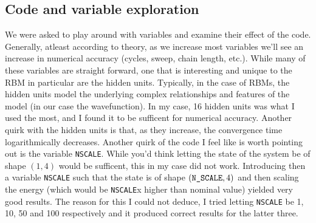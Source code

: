 \documentclass{article}
\begin{document}
\subsection{Code and variable exploration}
We were asked to play around with variables and examine their effect of the code. Generally, atleast according to theory, as we increase most variables we'll see an increase in numerical accuracy (cycles, sweep, chain length, etc.). While many of these variables are straight forward, one that is interesting and unique to the RBM in particular are the hidden units. Typically, in the case of RBMs, the hidden units model the underlying complex relationships and features of the model (in our case the wavefunction). In my case, 16 hidden units was what I used the most, and I found it to be sufficent for numerical accuracy. Another quirk with the hidden units is that, as they increase, the convergence time logarithmically decreases. \newline
Another quirk of the code I feel like is worth pointing out is the variable \texttt{N\textunderscore SCALE}. While you'd think letting the state of the system be of shape $(1,4)$ would be sufficent, this in my case did not work. Introducing then a variable \texttt{N\textunderscore SCALE} such that the state is of shape $(\texttt{N\textunderscore SCALE}, 4)$ and then scaling the energy (which would be \texttt{N\textunderscore SCALE}x higher than nominal value) yielded very good results. The reason for this I could not deduce, I tried letting \texttt{N\textunderscore SCALE} be 1, 10, 50 and 100 respectively and it produced correct results for the latter three.
\end{document}
